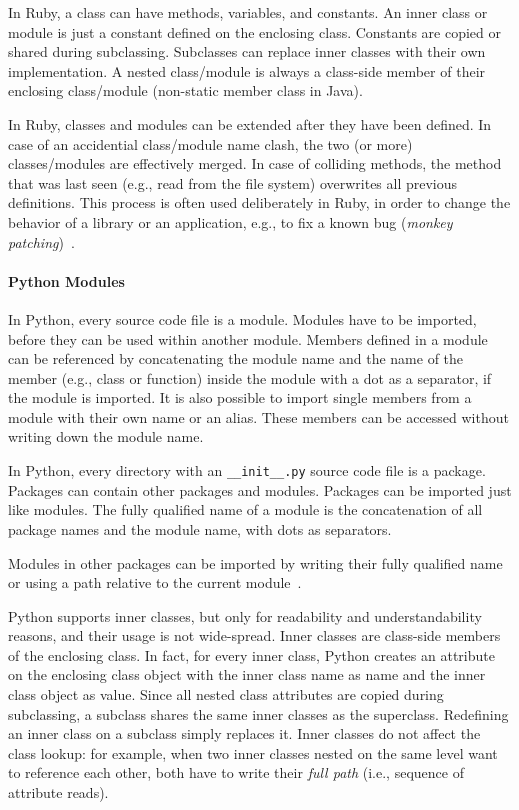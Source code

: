 In Ruby, a class can have methods, variables, and constants. An inner class or module is just a constant defined on the enclosing class. Constants are copied or shared during subclassing. Subclasses can replace inner classes with their own implementation. A nested class/module is always a class-side member of their enclosing class/module (non-static member class in Java).

In Ruby, classes and modules can be extended after they have been defined. In case of an accidential class/module name clash, the two (or more) classes/modules are effectively merged. In case of colliding methods, the method that was last seen (e.g., read from the file system) overwrites all previous definitions. This process is often used deliberately in Ruby, in order to change the behavior of a library or an application, e.g., to fix a known bug (\emph{monkey patching})~\cite{Benson:2008:AR:1386543}. 

\paragraph{Python Modules}
In Python, every source code file is a module. Modules have to be imported, before they can be used within another module. Members defined in a module can be referenced by concatenating the module name and the name of the member (e.g., class or function) inside the module with a dot as a separator, if the module is imported. It is also possible to import single members from a module with their own name or an alias. These members can be accessed without writing down the module name.

In Python, every directory with an \texttt{\_\_init\_\_.py} source code file is a package. Packages can contain other packages and modules. Packages can be imported just like modules. The fully qualified name of a module is the concatenation of all package names and the module name, with dots as separators.

Modules in other packages can be imported by writing their fully qualified name or using a path relative to the current module~\cite{pythonp1}.

Python supports inner classes, but only for readability and understandability reasons, and their usage is not wide-spread. Inner classes are class-side members of the enclosing class. In fact, for every inner class, Python creates an attribute on the enclosing class object with the inner class name as name and the inner class object as value. Since all nested class attributes are copied during subclassing, a subclass shares the same inner classes as the superclass. Redefining an inner class on a subclass simply replaces it. Inner classes do not affect the class lookup: for example, when two inner classes nested on the same level want to reference each other, both have to write their \emph{full path} (i.e., sequence of attribute reads).

